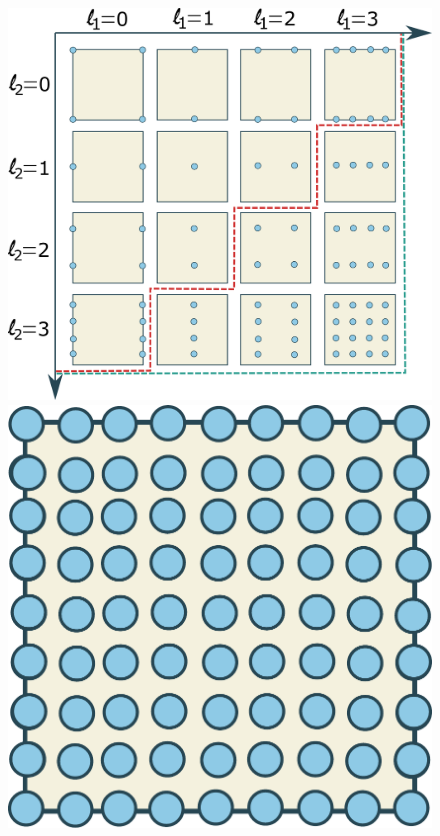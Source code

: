\documentclass[
  a4paper,  %
  twoside,  %
  bibliography=totoc,
  headsepline,
  cleardoublepage=empty,
  parskip=half,
  draft=false
]{scrbook}
\begin{document}
\begin{mdframed}[style=style]
\vspace{2.5mm}
\begin{figure}[H]
        \centering
\begin{minipage}{.73\textwidth}
        \centering
  \includegraphics[width=.8\linewidth]{graphics/grid_subspaces}
    \end{minipage}%
    \begin{minipage}{0.26\textwidth}
        \centering
  \includegraphics[width=.8\linewidth]{graphics/full_grid}
\vspace{4.5mm}

\end{minipage}
\end{figure}
\end{mdframed}
\end{document}

